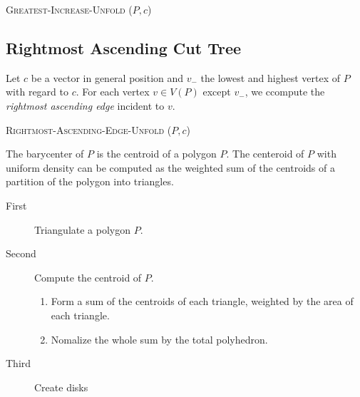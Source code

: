 \documentclass[11pt, letterpaper]{article}
\begin{document}
\begin{algorithm}
\caption{\textsc{Greatest-Increase-Unfold} ($P, c$)}\label{algo:greatest}
\begin{algorithmic}

        
    \EndFor
\end{algorithmic}
\end{algorithm}


\subsection{Rightmost Ascending Cut Tree}
Let $c$ be a vector in general position and $v_-$ the lowest and highest vertex of $P$ with regard to $c$. For each vertex $v \in V(P)$ except $v_-$, we ccompute the \textit{rightmost ascending edge} incident to $v$.
\begin{algorithm}
\caption{\textsc{Rightmost-Ascending-Edge-Unfold} ($P, c$)}\label{algo:rightmost}
\begin{algorithmic}
    \EndFor
\end{algorithmic}
\end{algorithm}

The barycenter of $P$ is the centroid of a polygon $P$. The centeroid of $P$ with uniform density can be computed as the weighted sum of the centroids of a partition of the polygon into triangles.
\begin{description}
  \item[First] Triangulate a polygon $P$.
  \item[Second] Compute the centroid of $P$.
	\begin{enumerate}
	  \item Form a sum of the centroids of each triangle, weighted by the area of each triangle.
	  \item Nomalize the whole sum by the total polyhedron.
	\end{enumerate}
  \item[Third] Create disks
\end{description}
\end{document}
